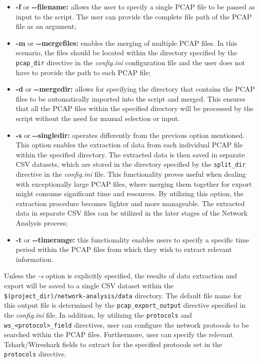 \begin{itemize}
	\item \textbf{-f} or \textbf{{-}{-}filename:} allows the user to specify a single PCAP file to be passed as input to the script. The user can provide the complete file path of the PCAP file as an argument;
	
	\item \textbf{-m} or \textbf{{-}{-}mergefiles:} enables the merging of multiple PCAP files. In this scenario, the files should be located within the directory specified by the \texttt{pcap\_dir} directive in the \textit{config.ini} configuration file and the user does not have to provide the path to each PCAP file;
	
	\item \textbf{-d} or \textbf{{-}{-}mergedir:} allows for specifying the directory that contains the PCAP files to be automatically imported into the script and merged. This ensures that all the PCAP files within the specified directory will be processed by the script without the need for manual selection or input.
	
	\item \textbf{-s} or \textbf{{-}{-}singledir:} operates differently from the previous option mentioned. This option enables the extraction of data from each individual PCAP file within the specified directory. The extracted data is then saved in separate CSV datasets, which are stored in the directory specified by the \texttt{split\_dir} directive in the \textit{config.ini} file. This functionality proves useful when dealing with exceptionally large PCAP files, where merging them together for export might consume significant time and resources. By utilizing this option, the extraction procedure becomes lighter and more manageable. The extracted data in separate CSV files can be utilized in the later stages of the Network Analysis process;
	
	\item \textbf{-t} or \textbf{{-}{-}timerange:} this functionality enables users to specify a specific time period within the PCAP files from which they wish to extract relevant information.
\end{itemize}

Unless the \textit{-s} option is explicitly specified, the results of data extraction and export will be saved to a single CSV dataset within the \\ \texttt{\$(project\_dir)/network-analysis/data} directory. The default file name for this output file is determined by the \texttt{pcap\_export\_output} directive specified in the \textit{config.ini} file. 
In addition, by utilizing the \texttt{protocols} and \texttt{ws\_<protocol>\_field} directives, user can configure the network protocols to be searched within the PCAP files. Furthermore, user can specify the relevant Tshark/Wireshark fields to extract for the specified protocols set in the \texttt{protocols} directive.

